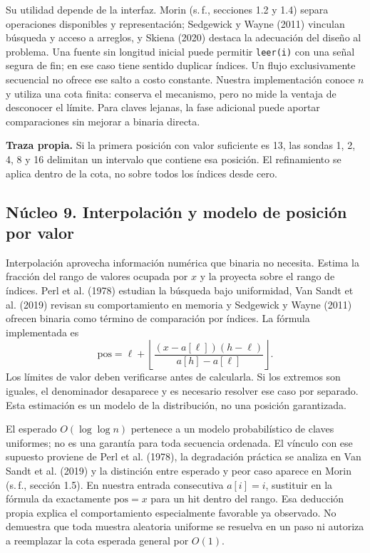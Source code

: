 Su utilidad depende de la interfaz. Morin (s.\,f., secciones 1.2 y 1.4) separa operaciones disponibles y representación; Sedgewick y Wayne (2011) vinculan búsqueda y acceso a arreglos, y Skiena (2020) destaca la adecuación del diseño al problema. Una fuente sin longitud inicial puede permitir \texttt{leer(i)} con una señal segura de fin; en ese caso tiene sentido duplicar índices. Un flujo exclusivamente secuencial no ofrece ese salto a costo constante. Nuestra implementación conoce $n$ y utiliza una cota finita: conserva el mecanismo, pero no mide la ventaja de desconocer el límite. Para claves lejanas, la fase adicional puede aportar comparaciones sin mejorar a binaria directa.

\textbf{Traza propia.} Si la primera posición con valor suficiente es 13, las sondas 1, 2, 4, 8 y 16 delimitan un intervalo que contiene esa posición. El refinamiento se aplica dentro de la cota, no sobre todos los índices desde cero.

\subsection{Núcleo 9. Interpolación y modelo de posición por valor}
Interpolación aprovecha información numérica que binaria no necesita. Estima la fracción del rango de valores ocupada por $x$ y la proyecta sobre el rango de índices. Perl et al. (1978) estudian la búsqueda bajo uniformidad, Van Sandt et al. (2019) revisan su comportamiento en memoria y Sedgewick y Wayne (2011) ofrecen binaria como término de comparación por índices. La fórmula implementada es
\[
\text{pos}=\ell+\left\lfloor\frac{(x-a[\ell])(h-\ell)}{a[h]-a[\ell]}\right\rfloor.
\]
Los límites de valor deben verificarse antes de calcularla. Si los extremos son iguales, el denominador desaparece y es necesario resolver ese caso por separado. Esta estimación es un modelo de la distribución, no una posición garantizada.

El esperado $O(\log\log n)$ pertenece a un modelo probabilístico de claves uniformes; no es una garantía para toda secuencia ordenada. El vínculo con ese supuesto proviene de Perl et al. (1978), la degradación práctica se analiza en Van Sandt et al. (2019) y la distinción entre esperado y peor caso aparece en Morin (s.\,f., sección 1.5). En nuestra entrada consecutiva $a[i]=i$, sustituir en la fórmula da exactamente $\text{pos}=x$ para un hit dentro del rango. Esa deducción propia explica el comportamiento especialmente favorable ya observado. No demuestra que toda muestra aleatoria uniforme se resuelva en un paso ni autoriza a reemplazar la cota esperada general por $O(1)$.

